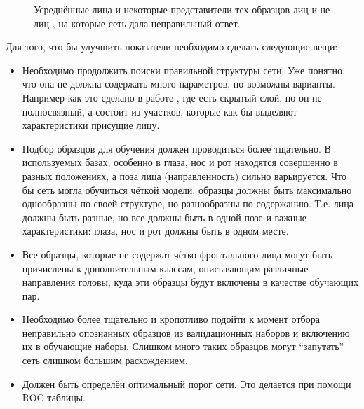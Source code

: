 \documentclass[12pt]{report}
\newenvironment{myItemize}{
 	\vspace{-10pt}
	\begin{itemize}[nolistsep]
}{\end{itemize}}
\begin{document}
\begin{figure}[h]
	\centering
	\hspace{1cm}
	\caption{Усреднённые лица и некоторые представители тех образцов лиц  и не лиц 
, на которые сеть дала неправильный ответ.}
	\label{fig:false_avg}
\end{figure}

Для того, что бы улучшить показатели необходимо сделать следующие вещи:
\begin{myItemize}
\item Необходимо продолжить поиски правильной структуры сети. Уже понятно, что она не должна содержать много 
параметров, но возможны варианты. Например как это сделано в работе \citep{rowley1998neural}, где есть скрытый слой, 
но он не полносвязный, а состоит из участков, которые как бы выделяют характеристики присущие лицу.
\item Подбор образцов для обучения должен проводиться более тщательно. В используемых базах, особенно в \citep
{huang2007labeled} глаза, нос и рот находятся совершенно в разных положениях, а поза лица (направленность) сильно 
варьируется. Что бы сеть могла обучиться чёткой модели, образцы должны быть максимально однообразны по своей 
структуре, но разнообразны по содержанию. Т.е. лица должны быть разные, но все должны быть в одной позе и важные 
характеристики: глаза, нос и рот должны быть в одном месте.
\item Все образцы, которые не содержат чётко фронтального лица могут быть причислены к дополнительным классам, 
описывающим различные направления головы, куда эти образцы будут включены в качестве обучающих пар.
\item Необходимо более тщательно и кропотливо подойти к момент отбора неправильно опознанных образцов из 
валидационных наборов и включению их в обучающие наборы. Слишком много таких образцов могут ``запутать'' сеть слишком 
большим расхождением.
\item Должен быть определён оптимальный порог сети. Это делается при помощи ROC таблицы.
\end{myItemize}


\end{document}
